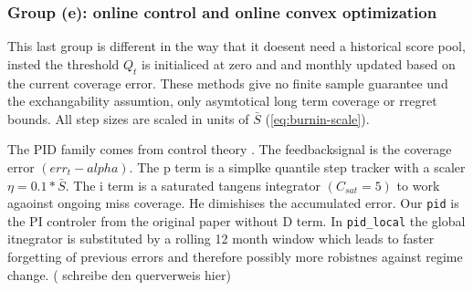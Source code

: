 \subsubsection{Group (e): online control and online convex optimization}
\label{sec:conformal:online}


This last group is different in the way that it doesent need a historical score pool, insted the threshold $Q_t$ is initialiced at zero and and monthly updated based on the current coverage error. These methods give no finite sample guarantee und the exchangability assumtion, only asymtotical long term coverage or rregret bounds. All step sizes are scaled in units of $\bar{S}$ (\cref{eq:burnin-scale}).


The PID family comes from control theory \parencite{angelopoulos2023pid}. The feedbacksignal is the coverage error $(err_t - alpha)$. The p term is a simplke quantile step tracker with a scaler $\eta = 0.1 * \bar{S}$. The i term is a saturated tangens integrator $(C_{sat} = 5)$ to work agaoinst ongoing miss coverage. He dimishises the accumulated error. Our \texttt{pid} is the PI controler from the original paper without D term. In \texttt{pid\_local} the global itnegrator is substituted by a rolling 12 month window which leads to faster forgetting of previous errors and therefore possibly more robistnes against regime change. ( schreibe den querverweis hier)

